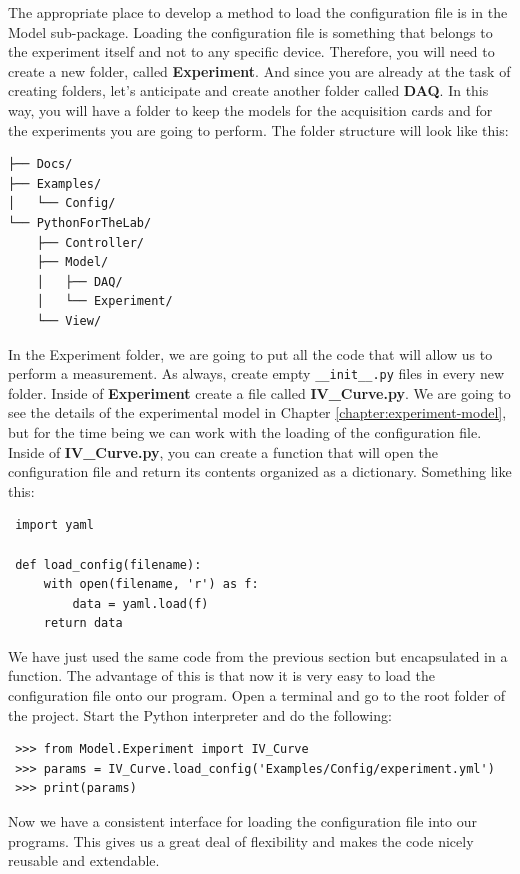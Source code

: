 The appropriate place to develop a method to load the configuration file is in the Model sub-package. Loading the configuration file is something that belongs to the experiment itself and not to any specific device. Therefore, you will need to create a new folder, called \textbf{Experiment}. And since you are already at the task of creating folders, let's anticipate and create another folder called \textbf{DAQ}. In this way, you will have a folder to keep the models for the acquisition cards and for the experiments you are going to perform. The folder structure will look like this:

\begin{verbatim}
├── Docs/
├── Examples/
│   └── Config/
└── PythonForTheLab/
    ├── Controller/
    ├── Model/
    │   ├── DAQ/
    │   └── Experiment/    
    └── View/
\end{verbatim}

In the Experiment folder, we are going to put all the code that will allow us to perform a measurement. As always, create empty \texttt{\_\_init\_\_.py} files in every new folder. Inside of \textbf{Experiment} create a file called \textbf{IV\_Curve.py}. We are going to see the details of the experimental model in Chapter \ref{chapter:experiment-model}, but for the time being we can work with the loading of the configuration file. Inside of \textbf{IV\_Curve.py}, you can create a function that will open the configuration file and return its contents organized as a dictionary. Something like this:

\begin{verbatim}
 import yaml
 
 def load_config(filename):
     with open(filename, 'r') as f:
         data = yaml.load(f)
     return data
\end{verbatim}

We have just used the same code from the previous section but encapsulated in a function. The advantage of this is that now it is very easy to load the configuration file onto our program. Open a terminal and go to the root folder of the project. Start the Python interpreter and do the following:

\begin{verbatim}
 >>> from Model.Experiment import IV_Curve
 >>> params = IV_Curve.load_config('Examples/Config/experiment.yml')
 >>> print(params)
\end{verbatim}

Now we have a consistent interface for loading the configuration file into our programs. This gives us a great deal of flexibility and makes the code nicely reusable and extendable. 

